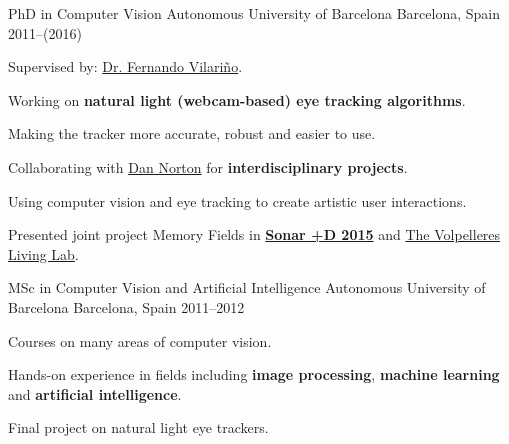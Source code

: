 

\begin{cventries}

  \cventry
    {PhD in Computer Vision} %
    {Autonomous University of Barcelona} %
    {Barcelona, Spain} %
    {2011--(2016)} %
    {
      \begin{cvitems} %
        \item {Supervised by: \href{http://vi.cvc.uab.es/fernando-vilarino}{Dr. Fernando Vilari\~no}.}
        \item {Working on \textbf{natural light (webcam-based) eye tracking algorithms}.}
        \item {Making the tracker more accurate, robust and easier to use.}
        \item {Collaborating with \href{http://ablab.org}{Dan Norton} for \textbf{interdisciplinary projects}.}
        \item {Using computer vision and eye tracking to create artistic user interactions.}
        \item {Presented joint project Memory Fields in \textbf{\href{http://sonarplusd.com/}{Sonar +D 2015}} and \href{http://l3.cvc.uab.es/}{The Volpelleres Living Lab}.}
      \end{cvitems}
    }

  \cventry
    {MSc in Computer Vision and Artificial Intelligence} %
    {Autonomous University of Barcelona} %
    {Barcelona, Spain} %
    {2011--2012} %
    {
      \begin{cvitems} %
        \item {Courses on many areas of computer vision.}
        \item {Hands-on experience in fields including \textbf{image processing}, \textbf{machine learning} and \textbf{artificial intelligence}.}
        \item {Final project on natural light eye trackers.}
      \end{cvitems}
    }


\end{cventries}
